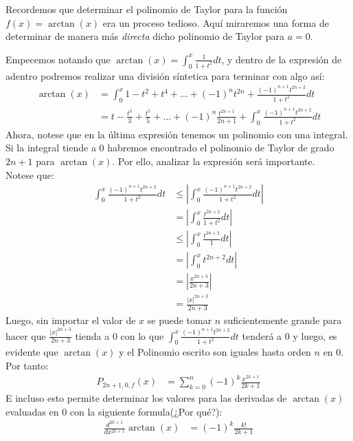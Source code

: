 \documentclass[12pt,a4paper,oneside]{memoir}
\begin{document}
\begin{example}
    Recordemos que determinar el polinomio de Taylor para la función $f(x) = \arctan(x)$ era un proceso tedioso. Aquí miraremos una forma de determinar de manera más \textit{directa} dicho polinomio de Taylor para $a = 0$.

    Empecemos notando que $\arctan(x) = \int_{0}^x \frac{1}{1+t^2} dt$, y dentro de la expresión de adentro podremos realizar una división síntetica para terminar con algo así:
    \begin{align*}
        \arctan(x) &= \int_{0}^x 1 - t^2 + t^4 + \dots +(-1)^n t^{2n} + \frac{(-1)^{n+1}t^{2n+2}}{1+t^2} dt\\
        &= t - \frac{t^3}{3} + \frac{t^5}{5} + \dots + (-1)^n \frac{t^{2n+1}}{2n+1} + \int_{0}^x \frac{(-1)^{n+1}t^{2n+2}}{1+t^2} dt 
    \end{align*}
    Ahora, notese que en la última expresión tenemos un polinomio con una integral. Si la integral tiende a $0$ habremos encontrado el polinomio de Taylor de grado $2n+1$ para $\arctan(x)$. Por ello, analizar la expresión será importante.\\

    Notese que:
    \begin{align*}
        \int_{0}^x \frac{(-1)^{n+1}t^{2n+2}}{1+t^2} dt &\le \left|\int_{0}^x \frac{(-1)^{n+1}t^{2n+2}}{1+t^2} dt \right|\\
        &= \left|\int_{0}^x \frac{t^{2n+2}}{1+t^2} dt \right|\\
        &\le \left|\int_{0}^x \frac{t^{2n+2}}{1} dt  \right|\\
        &= \left|\int_{0}^x t^{2n+2} dt\right|\\
        &= \left|\frac{x^{2n+3}}{2n+3}\right|\\
        &= \frac{ |x|^{2n+3}}{2n+3}
    \end{align*}
    Luego, sin importar el valor de $x$ se puede tomar $n$ suficientemente grande para hacer que $\frac{ |x|^{2n+3}}{2n+3}$ tienda a $0$ con lo que $\int_{0}^x \frac{(-1)^{n+1}t^{2n+2}}{1+t^2} dt $ tenderá a $0$ y luego, es evidente que $\arctan(x)$ y el Polinomio escrito son iguales hasta orden $n$ en $0$. Por tanto:
    \begin{align*}
        P_{2n+1, 0, f}(x) &= \sum_{k = 0}^n (-1)^k\frac{x^{2k+1}}{2k+1}
    \end{align*}
    E incluso esto permite determinar los valores para las derivadas de $\arctan(x)$ evaluadas en $0$ con la siguiente formula(¿Por qué?):
    \begin{align*}
        \frac{d^{2k+1}}{dx^{2k+1}} \arctan(x) &= (-1)^k\frac{k!}{2k+1}
    \end{align*}
\end{example}
\end{document}
